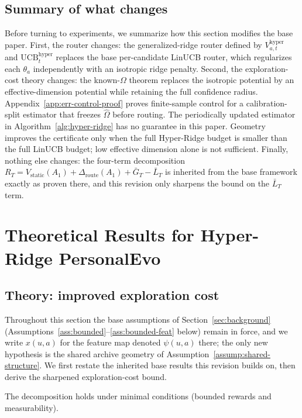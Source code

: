 \documentclass{article} %
\providecommand{\Rstatic}{V_{\mathrm{static}}}
\providecommand{\Droute}{\Delta_{\mathrm{route}}}
\begin{document}
\subsection{Summary of what changes}

Before turning to experiments, we summarize how this section modifies the base
paper. First, the router changes: the generalized-ridge router defined by
$V_{a,t}^{\mathrm{hyper}}$ and $\mathrm{UCB}_t^{\mathrm{hyper}}$ replaces the
base per-candidate LinUCB router, which regularizes each $\theta_a$
independently with an isotropic ridge penalty. Second, the exploration-cost
theory changes: the known-$\Omega$ theorem replaces the isotropic potential by
an effective-dimension potential while retaining the full confidence radius.
Appendix~\ref{app:err-control-proof} proves finite-sample control for a
calibration-split estimator that freezes $\widehat{\Omega}$ before routing.
The periodically updated estimator in Algorithm~\ref{alg:hyper-ridge} has no
guarantee in this paper. Geometry improves the certificate only when the full
Hyper-Ridge budget is smaller than the full LinUCB budget; low effective
dimension alone is not sufficient. Finally, nothing else changes: the
four-term decomposition
$R_T = \Rstatic(A_1) + \Droute(A_1) + \bar{G}_T - \bar{L}_T$ is inherited from
the base framework exactly as proven there, and this revision only sharpens
the bound on the $\bar{L}_T$ term.

\section{Theoretical Results for Hyper-Ridge PersonalEvo}
\label{sec:hyper-theory}



\subsection{Theory: improved exploration cost}

\label{sec:method-assump}

Throughout this section the base assumptions of Section~\ref{sec:background} (Assumptions~\ref{ass:bounded}--\ref{ass:bounded-feat} below) remain in force, and we write $x(u,a)$ for the feature map denoted $\psi(u,a)$ there; the only new hypothesis is the shared archive geometry of Assumption~\ref{assump:shared-structure}. We first restate the inherited base results this revision builds on, then derive the sharpened exploration-cost bound.

The decomposition holds under minimal conditions (bounded rewards and measurability).
\end{document}
